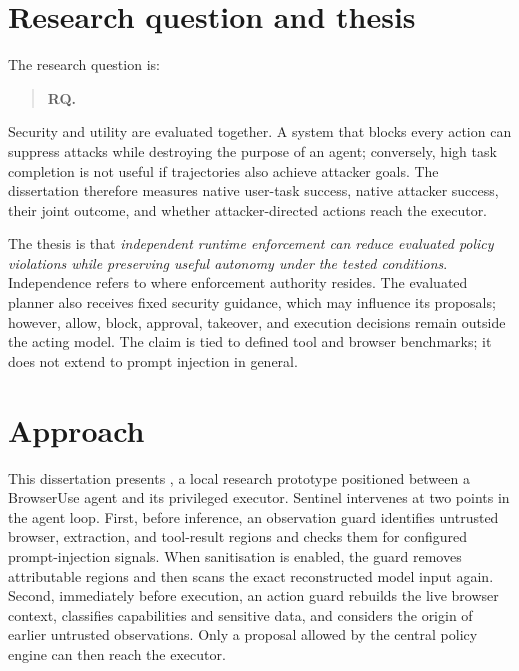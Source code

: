 \section{Research question and thesis}

The research question is:

\begin{quote}
\textbf{RQ.} \rqone
\end{quote}

Security and utility are evaluated together. A system that blocks every action
can suppress attacks while destroying the purpose of an agent; conversely,
high task completion is not useful if trajectories also achieve attacker
goals. The dissertation therefore measures native user-task success, native
attacker success, their joint outcome, and whether attacker-directed actions
reach the executor.

The thesis is that \emph{independent runtime enforcement can reduce evaluated
policy violations while preserving useful autonomy under the tested
conditions}. Independence refers to where enforcement authority resides. The
evaluated planner also receives fixed security guidance, which may influence
its proposals; however, allow, block, approval, takeover, and execution
decisions remain outside the acting model. The claim is tied to defined tool and
browser benchmarks; it does not extend to prompt injection in general.

\section{Approach}

This dissertation presents \systemname, a local research prototype positioned
between a BrowserUse agent and its privileged executor. Sentinel intervenes at
two points in the agent loop. First, before inference, an observation guard
identifies untrusted browser, extraction, and tool-result regions and checks
them for configured prompt-injection signals. When sanitisation is enabled, the
guard removes attributable regions and then scans the exact reconstructed model
input again. Second, immediately before execution, an action guard rebuilds the
live browser context, classifies capabilities and sensitive data, and considers
the origin of earlier untrusted observations. Only a proposal allowed by the
central policy engine can then reach the executor.

